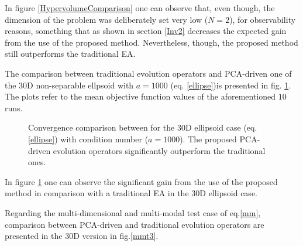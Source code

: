 In figure \ref{HypervolumeComparison} one can observe that, even though, the dimension of the problem was deliberately set very low ($N=2$), for observability reasons, something that as shown in section \ref{Inv2} decreases the expected gain from the use of the proposed method. Nevertheless, though, the proposed method still outperforms the traditional EA.  

The comparison between traditional evolution operators and PCA-driven one of the 30D non-separable ellpsoid with $a=1000$ (eq. \ref{ellipse})is presented in fig. \ref{Ellt3}. The plots refer to the mean objective function values of the aforementioned $10$ runs. 

\begin{figure}[h!]
\begin{minipage}[b]{1\linewidth}
 \centering
\end{minipage}
\caption{Convergence comparison between for the 30D ellipsoid case (eq. \ref{ellipse}) with condition number ($a = 1000$). The proposed PCA-driven evolution operators significantly outperform the traditional ones.} 
\label{Ellt3}
\end{figure}

In figure \ref{Ellt3} one can observe the significant gain from the use of the proposed method in comparison with a traditional EA in the 30D ellipsoid case.

Regarding the multi-dimensional and multi-modal test case of eq.\ref{mm}, comparison between PCA-driven and traditional evolution operators are presented in the 30D version in fig.\ref{mmt3}.  

